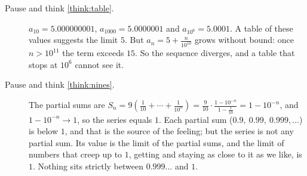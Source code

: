 \documentclass[11pt]{article}
\begin{document}
\begin{description}
  \item[Pause and think \ref{think:table}.] $a_{10}=5.000000001$, $a_{1000}=5.0000001$ and $a_{10^6}=5.0001$. A table of these values suggests the limit $5$. But $a_n=5+\frac n{10^{10}}$ grows without bound: once $n>10^{11}$ the term exceeds $15$. So the sequence diverges, and a table that stops at $10^6$ cannot see it.
  \item[Pause and think \ref{think:nines}.] The partial sums are $S_n=9\left(\frac1{10}+\cdots+\frac1{10^n}\right)=\frac9{10}\cdot\frac{1-10^{-n}}{1-\frac1{10}}=1-10^{-n}$, and $1-10^{-n}\to1$, so the series equals $1$. Each partial sum ($0.9,\ 0.99,\ 0.999,\dots$) is below $1$, and that is the source of the feeling; but the series is not any partial sum. Its value is the limit of the partial sums, and the limit of numbers that creep up to $1$, getting and staying as close to it as we like, is $1$. Nothing sits strictly between $0.999\ldots$ and $1$.
\end{description}
\end{document}

